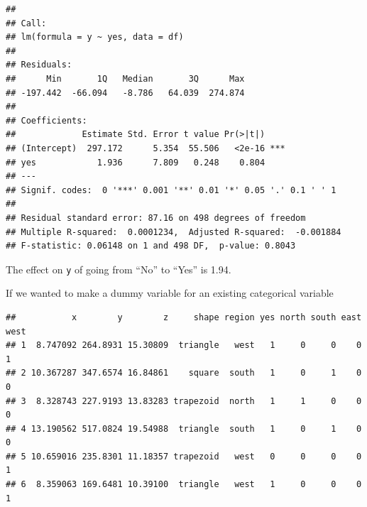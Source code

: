 \documentclass[]{book}
\newenvironment{Shaded}{\begin{snugshade}}{\end{snugshade}}
\newcommand{\KeywordTok}[1]{\textcolor[rgb]{0.13,0.29,0.53}{\textbf{#1}}}
\newcommand{\DecValTok}[1]{\textcolor[rgb]{0.00,0.00,0.81}{#1}}
\newcommand{\StringTok}[1]{\textcolor[rgb]{0.31,0.60,0.02}{#1}}
\newcommand{\OperatorTok}[1]{\textcolor[rgb]{0.81,0.36,0.00}{\textbf{#1}}}
\newcommand{\NormalTok}[1]{#1}
\theoremstyle{definition}
\theoremstyle{definition}
\theoremstyle{definition}
\theoremstyle{remark}
\begin{document}
\begin{verbatim}
## 
## Call:
## lm(formula = y ~ yes, data = df)
## 
## Residuals:
##      Min       1Q   Median       3Q      Max 
## -197.442  -66.094   -8.786   64.039  274.874 
## 
## Coefficients:
##             Estimate Std. Error t value Pr(>|t|)    
## (Intercept)  297.172      5.354  55.506   <2e-16 ***
## yes            1.936      7.809   0.248    0.804    
## ---
## Signif. codes:  0 '***' 0.001 '**' 0.01 '*' 0.05 '.' 0.1 ' ' 1
## 
## Residual standard error: 87.16 on 498 degrees of freedom
## Multiple R-squared:  0.0001234,  Adjusted R-squared:  -0.001884 
## F-statistic: 0.06148 on 1 and 498 DF,  p-value: 0.8043
\end{verbatim}

The effect on \texttt{y} of going from ``No'' to ``Yes'' is 1.94.

If we wanted to make a dummy variable for an existing categorical
variable

\begin{Shaded}
\end{Shaded}

\begin{verbatim}
##           x        y        z     shape region yes north south east west
## 1  8.747092 264.8931 15.30809  triangle   west   1     0     0    0    1
## 2 10.367287 347.6574 16.84861    square  south   1     0     1    0    0
## 3  8.328743 227.9193 13.83283 trapezoid  north   1     1     0    0    0
## 4 13.190562 517.0824 19.54988  triangle  south   1     0     1    0    0
## 5 10.659016 235.8301 11.18357 trapezoid   west   0     0     0    0    1
## 6  8.359063 169.6481 10.39100  triangle   west   1     0     0    0    1
\end{verbatim}
\end{document}
